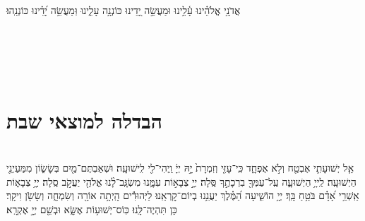 \documentclass[twoside, openany, parskip=half, 11pt]{book}
\begin{document}
\tachanunim

\vspace{\baselineskip}

\begin{sometimes}


\halfkaddish


\label{vihi noam}

אֲדֹנָ֥י אֱלֹהֵ֗ינוּ עָ֫לֵ֥ינוּ וּמַעֲשֵׂ֣ה יָ֭דֵינוּ כּוֹנְנָ֥ה עָלֵ֑ינוּ וּֽמַעֲשֵׂ֥ה יָ֝דֵ֗ינוּ כּוֹנְנֵֽהוּ׃\\

\label{v ata kadosh}
\kedushadesidra

\end{sometimes}

\fullkaddish

\vfill

\\
\\

\aleinu

\ledavid

\mournerskaddish

\vfill


 \\


\section[הבדלה]{ הבדלה למוצאי שבת } \label{havdala}

\\
אֵ֧ל יְשׁוּעָתִ֛י אֶבְטַ֖ח וְלֹ֣א אֶפְחָ֑ד כִּֽי־עָזִּ֤י וְזִמְרָת֙ יָ֣הּ יְיָ֔ וַֽיְהִי־לִ֖י לִֽישׁוּעָֽה׃
וּשְׁאַבְתֶּם־מַ֖יִם בְּשָׂשׂ֑וֹן מִמַּעַיְנֵ֖י הַיְשׁוּעָֽה׃
לַֽייָ֥ הַיְשׁוּעָ֑ה עַֽל־עַמְּךָ֖ בִרְכָתֶ֣ךָ סֶּֽלָה׃
יְיָ֣ צְבָא֣וֹת עִמָּ֑נוּ מִשְׂגָּֽב־לָ֨נוּ אֱלֹהֵ֖י יַעֲקֹ֣ב סֶֽלָה׃
יְיָ֥ צְבָא֑וֹת אַֽשְׁרֵ֥י אָ֝דָ֗ם בֹּטֵ֥חַ בָּֽךְ׃
יְיָ֥ הוֹשִׁ֑יעָה הַ֝מֶּ֗לֶךְ יַעֲנֵ֥נוּ בְיוֹם־קׇרְאֵֽנוּ׃
לַיְּהוּדִ֕ים הָֽיְתָ֥ה אוֹרָ֖ה וְשִׂמְחָ֑ה וְשָׂשֹׂ֖ן וִיקָֽר׃ כֵּן תִּהְיֶה־לָּֽנוּ׃ כּֽוֹס־יְשׁוּע֥וֹת אֶשָּׂ֑א וּבְשֵׁ֖ם יְיָ֣ אֶקְרָֽא׃
\end{document}

